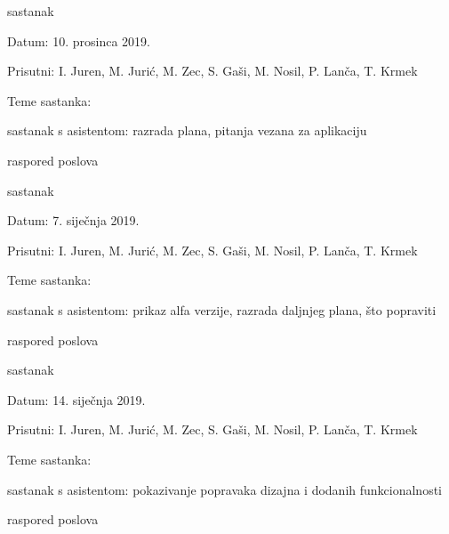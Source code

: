 \begin{packed_enum}
			\item  sastanak
			\item[] \begin{packed_item}
				\item Datum: 10. prosinca 2019.
				\item Prisutni: I. Juren, M. Jurić, M. Zec, S. Gaši, M. Nosil, P. Lanča, T. Krmek
				\item Teme sastanka:
				\begin{packed_item}
					\item  sastanak s asistentom: razrada plana, pitanja vezana za aplikaciju
					\item  raspored poslova
				\end{packed_item}
			\end{packed_item}
			
			\item  sastanak
			\item[] \begin{packed_item}
				\item Datum: 7. siječnja 2019.
				\item Prisutni: I. Juren, M. Jurić, M. Zec, S. Gaši, M. Nosil, P. Lanča, T. Krmek
				\item Teme sastanka:
				\begin{packed_item}
					\item  sastanak s asistentom: prikaz alfa verzije, razrada daljnjeg plana, što popraviti
					\item  raspored poslova
				\end{packed_item}
			\end{packed_item}
			
			\item  sastanak
			\item[] \begin{packed_item}
				\item Datum: 14. siječnja 2019.
				\item Prisutni: I. Juren, M. Jurić, M. Zec, S. Gaši, M. Nosil, P. Lanča, T. Krmek
				\item Teme sastanka:
				\begin{packed_item}
					\item  sastanak s asistentom: pokazivanje popravaka dizajna i dodanih funkcionalnosti
					\item  raspored poslova
				\end{packed_item}
			\end{packed_item}
			

\end{packed_enum}
